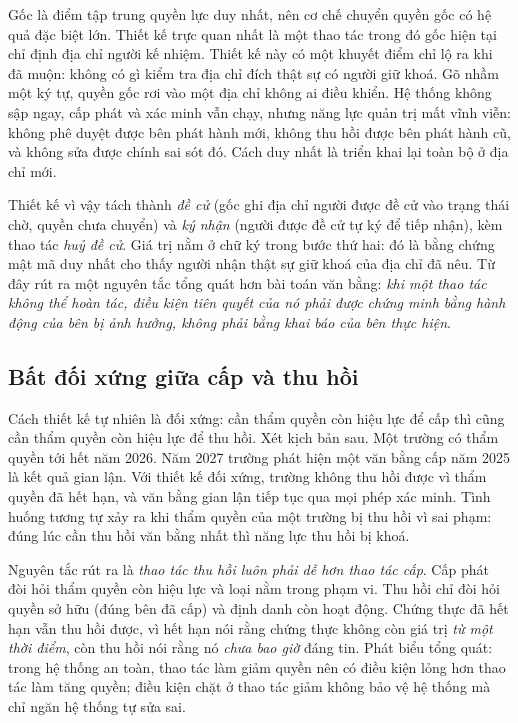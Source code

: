 Gốc là điểm tập trung quyền lực duy nhất, nên cơ chế chuyển quyền gốc có hệ quả đặc biệt lớn. Thiết kế trực quan nhất là một thao tác trong đó gốc hiện tại chỉ định địa chỉ người kế nhiệm. Thiết kế này có một khuyết điểm chỉ lộ ra khi đã muộn: không có gì kiểm tra địa chỉ đích thật sự có người giữ khoá. Gõ nhầm một ký tự, quyền gốc rơi vào một địa chỉ không ai điều khiển. Hệ thống không sập ngay, cấp phát và xác minh vẫn chạy, nhưng năng lực quản trị mất vĩnh viễn: không phê duyệt được bên phát hành mới, không thu hồi được bên phát hành cũ, và không sửa được chính sai sót đó. Cách duy nhất là triển khai lại toàn bộ ở địa chỉ mới.

Thiết kế vì vậy tách thành \emph{đề cử} (gốc ghi địa chỉ người được đề cử vào trạng thái chờ, quyền chưa chuyển) và \emph{ký nhận} (người được đề cử tự ký để tiếp nhận), kèm thao tác \emph{huỷ đề cử}. Giá trị nằm ở chữ ký trong bước thứ hai: đó là bằng chứng mật mã duy nhất cho thấy người nhận thật sự giữ khoá của địa chỉ đã nêu. Từ đây rút ra một nguyên tắc tổng quát hơn bài toán văn bằng: \emph{khi một thao tác không thể hoàn tác, điều kiện tiên quyết của nó phải được chứng minh bằng hành động của bên bị ảnh hưởng, không phải bằng khai báo của bên thực hiện}.

\subsection{Bất đối xứng giữa cấp và thu hồi}
\label{sec:bat-doi-xung}

Cách thiết kế tự nhiên là đối xứng: cần thẩm quyền còn hiệu lực để cấp thì cũng cần thẩm quyền còn hiệu lực để thu hồi. Xét kịch bản sau. Một trường có thẩm quyền tới hết năm 2026. Năm 2027 trường phát hiện một văn bằng cấp năm 2025 là kết quả gian lận. Với thiết kế đối xứng, trường không thu hồi được vì thẩm quyền đã hết hạn, và văn bằng gian lận tiếp tục qua mọi phép xác minh. Tình huống tương tự xảy ra khi thẩm quyền của một trường bị thu hồi vì sai phạm: đúng lúc cần thu hồi văn bằng nhất thì năng lực thu hồi bị khoá.

Nguyên tắc rút ra là \emph{thao tác thu hồi luôn phải dễ hơn thao tác cấp}. Cấp phát đòi hỏi thẩm quyền còn hiệu lực và loại nằm trong phạm vi. Thu hồi chỉ đòi hỏi quyền sở hữu (đúng bên đã cấp) và định danh còn hoạt động. Chứng thực đã hết hạn vẫn thu hồi được, vì hết hạn nói rằng chứng thực không còn giá trị \emph{từ một thời điểm}, còn thu hồi nói rằng nó \emph{chưa bao giờ} đáng tin. Phát biểu tổng quát: trong hệ thống an toàn, thao tác làm giảm quyền nên có điều kiện lỏng hơn thao tác làm tăng quyền; điều kiện chặt ở thao tác giảm không bảo vệ hệ thống mà chỉ ngăn hệ thống tự sửa sai.

